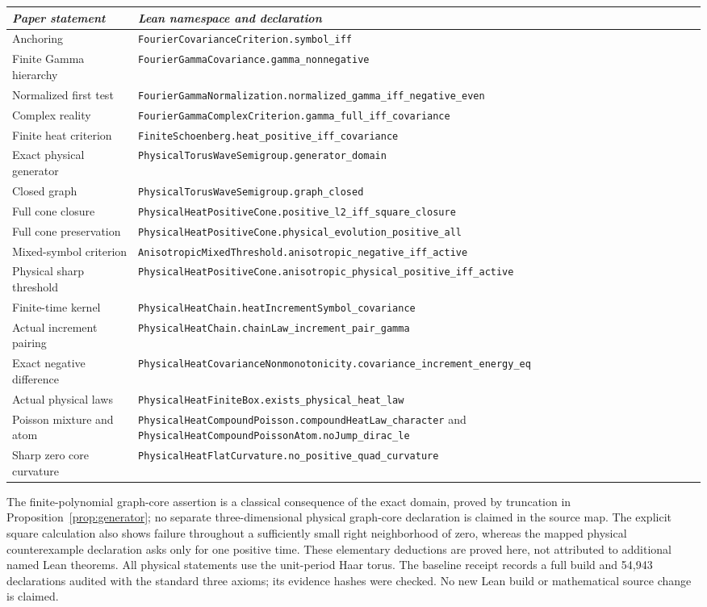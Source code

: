 \documentclass[11pt]{article}
\theoremstyle{remark}\newtheorem{remark}[theorem]{Remark}
\newcommand{\code}[1]{{\small\nolinkurl{#1}}}
\begin{document}
\begin{longtable}{@{}p{}p{}@{}}
\textit{Paper statement}&\textit{Lean namespace and declaration}\\\hline
Anchoring&\code{FourierCovarianceCriterion.symbol_iff}\\[3pt]
Finite Gamma hierarchy&\code{FourierGammaCovariance.gamma_nonnegative}\\[3pt]
Normalized first test&\code{FourierGammaNormalization.normalized_gamma_iff_negative_even}\\[3pt]
Complex reality&\code{FourierGammaComplexCriterion.gamma_full_iff_covariance}\\[3pt]
Finite heat criterion&\code{FiniteSchoenberg.heat_positive_iff_covariance}\\[3pt]
Exact physical generator&\code{PhysicalTorusWaveSemigroup.generator_domain}\\[3pt]
Closed graph&\code{PhysicalTorusWaveSemigroup.graph_closed}\\[3pt]
Full cone closure&\code{PhysicalHeatPositiveCone.positive_l2_iff_square_closure}\\[3pt]
Full cone preservation&\code{PhysicalHeatPositiveCone.physical_evolution_positive_all}\\[3pt]
Mixed-symbol criterion&\code{AnisotropicMixedThreshold.anisotropic_negative_iff_active}\\[3pt]
Physical sharp threshold&\code{PhysicalHeatPositiveCone.anisotropic_physical_positive_iff_active}\\[3pt]
Finite-time kernel&\code{PhysicalHeatChain.heatIncrementSymbol_covariance}\\[3pt]
Actual increment pairing&\code{PhysicalHeatChain.chainLaw_increment_pair_gamma}\\[3pt]
Exact negative difference&\code{PhysicalHeatCovarianceNonmonotonicity.covariance_increment_energy_eq}\\
Actual physical laws&\code{PhysicalHeatFiniteBox.exists_physical_heat_law}\\[3pt]
Poisson mixture and atom&\code{PhysicalHeatCompoundPoisson.compoundHeatLaw_character} and \code{PhysicalHeatCompoundPoissonAtom.noJump_dirac_le}\\[3pt]
Sharp zero core curvature&\code{PhysicalHeatFlatCurvature.no_positive_quad_curvature}\\
\end{longtable}

The finite-polynomial graph-core assertion is a classical
consequence of the exact domain, proved by truncation in
Proposition~\ref{prop:generator}; no separate three-dimensional
physical graph-core declaration is claimed in the source map.
The explicit square calculation also shows failure throughout
a sufficiently small right neighborhood of zero, whereas the
mapped physical counterexample declaration asks only for one
positive time. These elementary deductions are proved here,
not attributed to additional named Lean theorems.
All physical statements use the unit-period Haar torus. The baseline
receipt records a full build and 54,943 declarations audited with the
standard three axioms; its evidence hashes were checked. No new Lean
build or mathematical source change is claimed.
\end{document}
